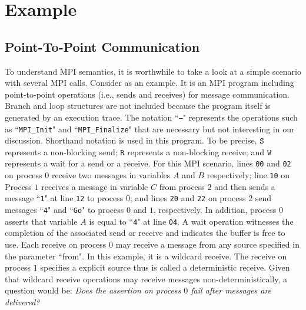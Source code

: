 \section{Example}\label{sec:example}
\subsection{Point-To-Point Communication}
To understand MPI semantics, it is worthwhile to take a look at a simple scenario with several MPI calls. Consider  as an example. It is an MPI program including point-to-point operations (i.e., sends and receives) for message communication. Branch and loop structures are not included because the program itself is generated by an execution trace. The notation ``\texttt{---}" represents the operations such as ``\texttt{MPI\_Init}" and ``\texttt{MPI\_Finalize}" that are necessary but not interesting in our discussion. Shorthand notation is used in this program. To be precise, $\mathtt{S}$ represents a non-blocking send; $\mathtt{R}$ represents a non-blocking receive; and $\mathtt{W}$ represents a wait for a send or a receive. For this MPI scenario, lines \texttt{00} and \texttt{02} on process $0$ receive two messages in variables $A$ and $B$ respectively; line \texttt{10} on Process $1$ receives a message in variable $C$ from process $2$ and then sends a message ``\texttt{1}" at line \texttt{12} to process $0$; and lines \texttt{20} and \texttt{22} on process $2$ send messages ``\texttt{4}" and ``\texttt{Go}" to process $0$ and $1$, respectively. In addition, process $0$ asserts that variable $A$ is equal to ``\texttt{4}" at line \texttt{04}. A wait operation witnesses the completion of the associated send or receive and indicates the buffer is free to use. Each receive on process $0$ may receive a message from any source specified in the parameter ``from". In this example, it is a wildcard receive. The receive on process $1$ specifies a explicit source thus is called a deterministic receive. Given that wildcard receive operations may receive messages non-deterministically, a question would be: \textit{Does the assertion on process $0$ fail after messages are delivered?}

